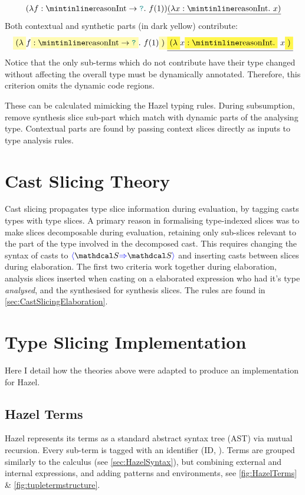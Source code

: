 \[(\lambda f: \code{Int} \to \dyn.\ f(1))\underline{(\lambda x : \code{Int}.\ x)}\]
Both contextual and synthetic parts (in dark yellow) contribute:
\[\hlcmaths[yellow!30]{(\lambda} f\hlcmaths[yellow!30]{: \code{Int} \to \dyn}.\ f(1)\hlcmaths[yellow!30]{)}\underline{\hlcmaths[yellow!70]{(\lambda} x \hlcmaths[yellow!70]{: \code{Int}.}\ x\hlcmaths[yellow!70]{)}}\]
Notice that the only sub-terms which do not contribute have their type changed without affecting the overall type must be dynamically annotated. Therefore, this criterion omits the dynamic code regions.

These can be calculated mimicking the Hazel typing rules. During subsumption, remove synthesis slice sub-part which match with dynamic parts of the analysing type. Contextual parts are found by passing context slices directly as inputs to type analysis rules.

\section{Cast Slicing Theory}\label{sec:CastSlicingTheory}
Cast slicing propagates type slice information during evaluation, by tagging casts types with type slices. A primary reason in formalising type-indexed slices was to make slices decomposable during evaluation, retaining only sub-slices relevant to the part of the type involved in the decomposed cast. This requires changing the syntax of casts to $\scast{\S}{\S}$ and inserting casts between slices during elaboration. The first two criteria work together during elaboration, analysis slices inserted when casting on a elaborated expression who had it's type \textit{analysed}, and the synthesised for synthesis slices. The rules are found in
\cref{sec:CastSlicingElaboration}.

\section{Type Slicing Implementation}\label{sec:TypeSlicingImplementation}
Here I detail how the theories above were adapted to produce an implementation for Hazel.
\subsection{Hazel Terms}
\label{sec:HazelTerms}
Hazel represents its terms as a standard abstract syntax tree (AST) via mutual recursion. Every sub-term is tagged with an identifier (ID, ). Terms are grouped similarly to the calculus (see \cref{sec:HazelSyntax}), but combining external and internal expressions, and adding patterns and environments, see \cref{fig:HazelTerms} \& \ref{fig:tupletermstructure}.


